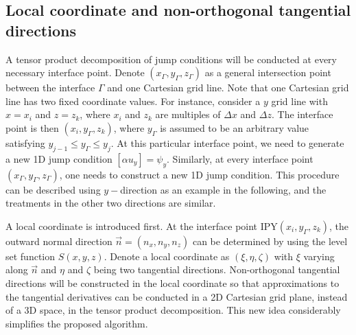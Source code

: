 \documentclass[dissertation]{uathesis}
\begin{document}
\begin{body}
\begin{flushleft}
\subsection{Local coordinate and non-orthogonal tangential directions}
\hspace{1cm} A tensor product decomposition of jump conditions will be conducted at every necessary interface point. 
Denote $(x_{\Gamma},y_{\Gamma},z_{\Gamma})$ as a general intersection point between the interface $\Gamma$ and one Cartesian grid line. 
Note that one Cartesian grid line has two fixed coordinate values. For instance, consider a $y$ grid line with $x=x_i$ and $z=z_k$, where $x_i$ and $z_k$ are multiples of $\Delta x$ and $\Delta z$. 
The interface point is then  $(x_{i},y_{\Gamma},z_{k})$, where $y_{\Gamma}$ is assumed to be an arbitrary value satisfying $y_{j-1} \le y_{\Gamma} \le y_{j}$. 
At this particular interface point, we need to generate a new 1D jump condition $[\alpha u_y]=\psi_y$. 
Similarly, at every interface point $(x_{\Gamma},y_{\Gamma},z_{\Gamma})$, one needs to construct a new 1D jump condition. This procedure can be described using $y-$direction as an example in the following, and the treatments in the other two directions are similar. 

\hspace{1cm} A local coordinate is introduced first. At the interface point IPY$(x_{i},y_{\Gamma},z_{k})$, the outward normal direction $\vec{n}=(n_x,n_y,n_z)$ can be determined by using the level set function $S(x,y,z)$. 
Denote a local coordinate as $(\xi, \eta, \zeta)$ with $\xi$ varying along $\vec{n}$
and $\eta$ and $\zeta$ being two tangential directions. 
Non-orthogonal tangential directions will be constructed in the local coordinate so that approximations
to the tangential derivatives can be conducted in a 2D Cartesian grid plane, 
instead of a 3D space, in the tensor 
product decomposition. This new idea considerably simplifies the proposed algorithm. 


\end{flushleft}
\end{body}
\end{document}
